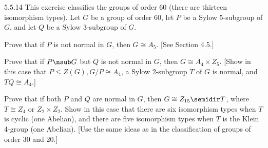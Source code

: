 \begin{spex}{5.5.14}
    This exercise classifies the groups of order 60 (there are thirteen isomorphism types).
	Let $G$ be a group of order 60, let $P$ be a Sylow 5-subgroup of $G$, and let $Q$ be a Sylow 3-subgroup of $G$.
    \begin{subexercises}
        \item Prove that if $P$ is not normal in $G$, then $G \cong A_5$. [See Section 4.5.]
        \item Prove that if $P \nsub G$ but $Q$ is not normal in $G$, then $G \cong A_4 \times Z_5$. [Show in this case that $P \leq Z(G), G/P \cong A_4$, a Sylow 2-subgroup $T$ of $G$ is normal, and $TQ \cong A_4$.]
        \item Prove that if both $P$ and $Q$ are normal in $G$, then $G \cong Z_{15} \semidir T$, where $T \cong Z_4$ or $Z_2 \times Z_2$.
	    Show in this case that there are six isomorphism types when $T$ is cyclic (one Abelian), and there are five isomorphism types when $T$ is the Klein 4-group (one Abelian). [Use the same ideas as in the classification of groups of order 30 and 20.]
    \end{subexercises}
\end{spex}

